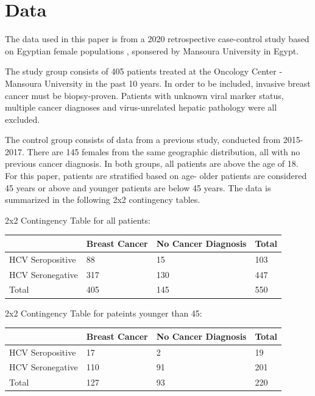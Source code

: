 \documentclass[12pt, titlepage]{article}
\begin{document}
\section{Data}
\label{sec:data}

The data used in this paper is from a 2020 retrospective case-control 
study based on Egyptian female populations \citep{2020association},
sponsered by Mansoura University in Egypt.

The study group consists of 405 patients treated at the Oncology Center 
- Mansoura University in the past 10 years. In order to be included, 
invasive breast cancer must be biopsy-proven. Patients with unknown 
viral marker status, multiple cancer diagnoses and virus-unrelated 
hepatic pathology were all excluded. 

The control group consists of 
data from a previous study, conducted from 2015-2017. There are 145 
females from the same geographic distribution, all with no previous 
cancer diagnosis. In both groups, all patients are above the age of 
18. For this paper, patients are stratified based on age- older patients 
are considered 45 years or above and younger patients are below 45 years. 
The data is summarized in the following 2x2 contingency tables. 

\vspace{1cm}

2x2 Contingency Table for all patients:

\begin{tabular}{ | m{4cm} | m{4cm}| m{4cm} | m{2cm} | }
  \hline
    & Breast Cancer & No Cancer Diagnosis & Total\\ 
  \hline
  HCV Seropositive & 88 & 15 & 103 \\ 
  \hline
  HCV Seronegative & 317 & 130 & 447 \\ 
  \hline
  Total & 405 & 145 & 550 \\ 
  \hline
\end{tabular}

\vspace{1cm}

2x2 Contingency Table for pateints younger than 45:

\begin{tabular}{ | m{4cm} | m{4cm}| m{4cm} | m{2cm} | }
  \hline
    & Breast Cancer & No Cancer Diagnosis & Total\\ 
  \hline
  HCV Seropositive & 17 & 2 & 19 \\ 
  \hline
  HCV Seronegative & 110 & 91 & 201 \\ 
  \hline
  Total & 127 & 93 & 220 \\ 
  \hline
\end{tabular}
\end{document}
